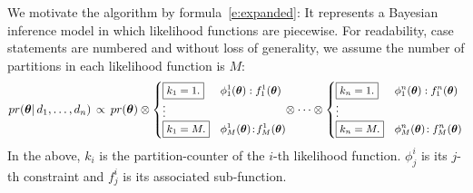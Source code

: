 We motivate the algorithm by formula~\ref{e:expanded}:
It represents a Bayesian inference model in which likelihood functions are piecewise.
%
For readability, case statements are numbered and without loss of
generality, we assume the number of partitions in each
likelihood function is $M$:
\begin{align}
\label{e:expanded}
pr(\boldsymbol\theta | \, d_1, \ldots, d_n) \, 
\propto \,
pr(\boldsymbol\theta) \otimes
{\footnotesize
\begin{cases}
\boxed{k_1 = 1.} &{\phi^{1}_{1}(\boldsymbol\theta)  : f^{1}_{1}(\boldsymbol\theta)}\\
\vdots
\\
\boxed{k_1 = M.} &\phi^{1}_{M}(\boldsymbol\theta)  \!:\! f^{1}_{M}(\boldsymbol\theta)
\end{cases}
}%
\!\!
\otimes
\cdots
\otimes
{\footnotesize
\begin{cases}
\boxed{k_n = 1.} &\phi^{n}_{1}(\boldsymbol\theta)  : f^{n}_{1}(\boldsymbol\theta)\\
\vdots
\\
\boxed{k_n = M.} &\phi^{n}_{M}(\boldsymbol\theta)  \!: f^{n}_{M}(\boldsymbol\theta)
\end{cases}
}%
\end{align} 
In the above, $k_i$ is the partition-counter of the $i$-th likelihood function. 
$\phi^i_{j}$ is its $j$-th constraint and
 $f^i_{j}$ is its associated sub-function. 

